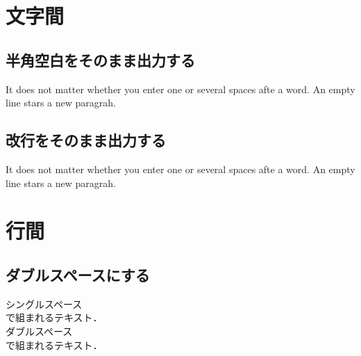 \section{文字間}

\subsection{半角空白をそのまま出力する}
\begin{usage}
\obeyspaces 
\end{usage}

\begin{showwhitespaces}
\begin{inout}
\obeyspaces
It does not matter whether you enter one or 
several                  spaces afte a word.
An   empty        line stars a new paragrah.
\end{inout} 
\end{showwhitespaces}

\subsection{改行をそのまま出力する}

\begin{usage}
\obeylines
\end{usage}

\begin{showwhitespaces}
\begin{inout}
\obeyspaces \obeylines
It does not matter whether you enter one or 
several                  spaces afte a word.
An   empty        line stars a new paragrah. 
\end{inout}
\end{showwhitespaces}

\section{行間}

\subsection{ダブルスペースにする}

\begin{usage}
\usepackage{setspace}
\doublespacing
\end{usage}

\begin{inout}
\usepackage{setspace}
シングルスペース\\ で組まれるテキスト．\\
\doublespacing
ダブルスペース\\ で組まれるテキスト．
\end{inout}

